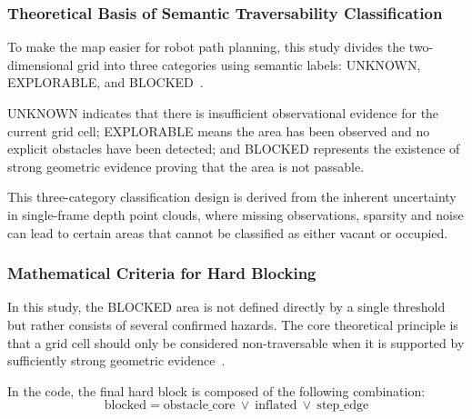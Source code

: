 \documentclass[12pt]{interim_report}
\begin{document}
\subsubsection{Theoretical Basis of Semantic Traversability Classification}
\label{subsec:chizou-semantic-traversability}

To make the map easier for robot path planning, this study divides the two-dimensional grid into three categories using semantic labels: UNKNOWN, EXPLORABLE, and BLOCKED~\cite{sanchez2019pff,carvalho2024traversability}.

UNKNOWN indicates that there is insufficient observational evidence for the current grid cell; EXPLORABLE means the area has been observed and no explicit obstacles have been detected; and BLOCKED represents the existence of strong geometric evidence proving that the area is not passable.

This three-category classification design is derived from the inherent uncertainty in single-frame depth point clouds, where missing observations, sparsity and noise can lead to certain areas that cannot be classified as either vacant or occupied.

\subsubsection{Mathematical Criteria for Hard Blocking}
\label{subsec:chizou-hard-blocking}

In this study, the BLOCKED area is not defined directly by a single threshold but rather consists of several confirmed hazards. The core theoretical principle is that a grid cell should only be considered non-traversable when it is supported by sufficiently strong geometric evidence~\cite{sanchez2019pff}.

In the code, the final hard block is composed of the following combination:
\begin{equation}
    \mathrm{blocked} = \mathrm{obstacle\_core} \ \vee\ \mathrm{inflated} \ \vee\ \mathrm{step\_edge}
\end{equation}
\end{document}
